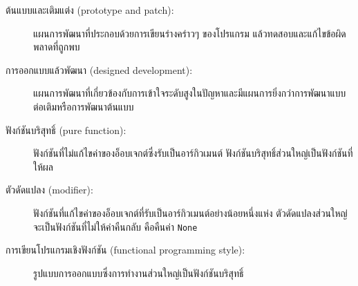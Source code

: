 \begin{description}


\item[ต้นแบบและเติมแต่ง (prototype and patch):] แผนการพัฒนาที่ประกอบด้วยการเขียนร่างคร่าวๆ ของโปรแกรม แล้วทดสอบและแก้ไขข้อผิดพลาดที่ถูกพบ


\item[การออกแบบแล้วพัฒนา (designed development):] แผนการพัฒนาที่เกี่ยวข้องกับการเข้าใจระดับสูงในปัญหาและมีแผนการยิ่งกว่าการพัฒนาแบบต่อเติมหรือการพัฒนาต้นแบบ


\item[ฟังก์ชันบริสุทธิ์ (pure function):] ฟังก์ชันที่ไม่แก้ไขค่าของอ็อบเจกต์ซึ่งรับเป็นอาร์กิวเมนต์ ฟังก์ชันบริสุทธิ์ส่วนใหญ่เป็นฟังก์ชันที่ให้ผล

  
\item[ตัวดัดแปลง (modifier):] ฟังก์ชันที่แก้ไขค่าของอ็อบเจกต์ที่รับเป็นอาร์กิวเมนต์อย่างน้อยหนึ่งแห่ง 
ตัวดัดแปลงส่วนใหญ่จะเป็นฟังก์ชันที่ไม่ให้ค่าคืนกลับ คือคืนค่า {\tt None}


\item[การเขียนโปรแกรมเชิงฟังก์ชัน (functional programming style):] รูปแบบการออกแบบซึ่งการทำงานส่วนใหญ่เป็นฟังก์ชันบริสุทธิ์


\end{description}
